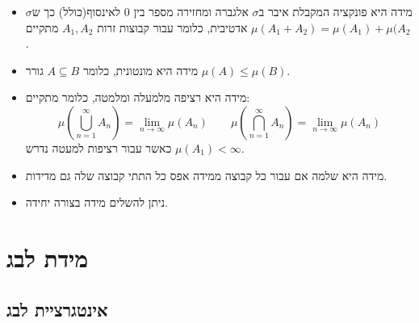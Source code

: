 \documentclass{tstextbook}
\begin{document}
\begin{summary}
  \begin{itemize}
    \item מידה היא פונקציה המקבלת איבר ב\(\sigma\) אלגברה ומחזירה מספר בין 0 לאינסוף(כולל) כך ש\(\sigma\) אדטיבית, כלומר עבור קבוצות זרות \(A_{1},A_{2}\) מתקיים \(\mu(A_{1}+A_{2})=\mu(A_{1})+\mu(A_{2}\).
    \item מידה היא מונטונית, כלומר \(A\subseteq B\) גורר \(\mu(A)\leq \mu(B)\).
    \item מידה היא רציפה מלמעלה ומלמטה, כלומר מתקיים:
$$\mu\left( \bigcup_{n=1}^{\infty}A_{n} \right)=\lim_{ n \to \infty } \mu(A_{n})\qquad \mu\left( \bigcap_{n=1}^{\infty}A_{n} \right)=\lim_{ n \to \infty } \mu(A_{n})$$
כאשר עבור רציפות למעטה נדרש \(\mu(A_{1})< \infty\).
    \item מידה היא שלמה אם עבור כל קבוצה ממידה אפס כל התתי קבוצה שלה גם מדידות.
    \item ניתן להשלים מידה בצורה יחידה.
  \end{itemize}
\end{summary}
\chapter{מידת לבג}

\section{אינטגרציית לבג}
\end{document}
